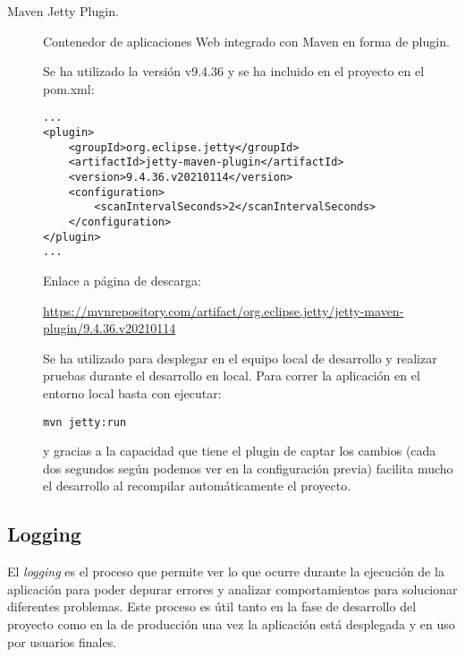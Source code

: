 \begin{description}
	\item[Maven Jetty Plugin.] Contenedor de aplicaciones Web integrado con Maven en forma de plugin.
	
		Se ha utilizado la versión  v9.4.36 y se ha incluido en el proyecto en el pom.xml:
	
\begin{verbatim}
...
<plugin>
	<groupId>org.eclipse.jetty</groupId>
	<artifactId>jetty-maven-plugin</artifactId>
	<version>9.4.36.v20210114</version>
	<configuration>
		<scanIntervalSeconds>2</scanIntervalSeconds>
	</configuration>
</plugin>
...
\end{verbatim}
		
Enlace a página de descarga:
		
		\url{https://mvnrepository.com/artifact/org.eclipse.jetty/jetty-maven-plugin/9.4.36.v20210114}
		
Se ha utilizado para desplegar en el equipo local de desarrollo y realizar pruebas durante el desarrollo en local. Para correr la aplicación en el entorno local basta con ejecutar: 
		
\begin{verbatim}
mvn jetty:run
\end{verbatim}

y gracias a la capacidad que tiene el plugin de captar los cambios (cada dos segundos según podemos ver en la configuración previa) facilita mucho el desarrollo al recompilar automáticamente el proyecto.
		
\end{description}
\subsection{Logging}
El \textit{logging} es el proceso que permite ver lo que ocurre durante la ejecución de la aplicación para poder depurar errores y analizar comportamientos para solucionar diferentes problemas. Este proceso es útil tanto en la fase de desarrollo del proyecto como en la de producción una vez la aplicación está desplegada y en uso por usuarios finales.

